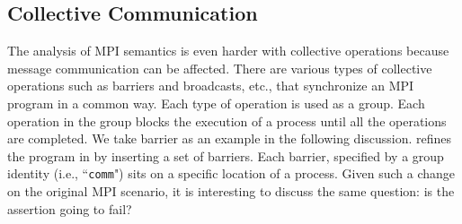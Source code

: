 \subsection{Collective Communication}

\examplefigoneB

The analysis of MPI semantics is even harder with collective operations because message communication can be affected. There are various types of collective operations such as barriers and broadcasts, etc., that synchronize an MPI program in a common way. Each type of operation is used as a group. Each operation in the group blocks the execution of a process until all the operations are completed. We take barrier as an example in the following discussion.
 refines the program in  by inserting a set of barriers. Each barrier, specified by a group identity (i.e., ``\texttt{comm}") sits on a specific location of a process. 
Given such a change on the original MPI scenario, it is interesting to discuss the same question: is the assertion going to fail?  

